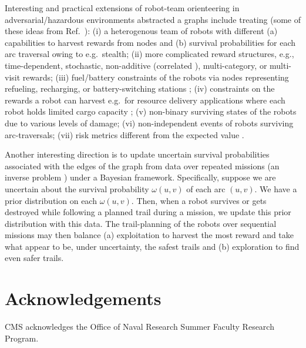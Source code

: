 \documentclass[fleqn,10pt,lineno]{wlpeerj}
\begin{document}
Interesting and practical extensions of robot-team orienteering in adversarial/hazardous environments abstracted a graphs include treating (some of these ideas from Ref.~\cite{jorgensen2018team}): 
(i) a heterogenous team of robots with different (a) capabilities to harvest rewards from nodes and (b) survival probabilities for each arc traversal owing to e.g.\ stealth;
(ii) more complicated reward structures, e.g., time-dependent, stochastic, non-additive (correlated \cite{yu2014correlated}), multi-category, or multi-visit rewards;
(iii) fuel/battery constraints of the robots via nodes representing refueling, recharging, or battery-switching stations \cite{asghar2023risk,khuller2011fill,liao2016electric,yu2019coverage}; 
(iv) constraints on the rewards a robot can harvest e.g.\ for resource delivery applications where each robot holds limited cargo capacity \cite{coelho2014thirty};
(v) non-binary surviving states of the robots due to various levels of damage;
(vi) non-independent events of robots surviving arc-traversals;
(vii) risk metrics different from the expected value \cite{majumdar2020should}.

Another interesting direction is to update uncertain survival probabilities associated with the edges of the graph from data over repeated missions (an inverse problem \cite{burton1992instance}) under a Bayesian framework. 
Specifically, suppose we are uncertain about the survival probability $\omega(u, v)$ of each arc $(u,v)$. We have a prior distribution on each $\omega(u,v)$. Then, when a robot survives or gets destroyed while following a planned trail during a mission, we update this prior distribution with this data. 
The trail-planning of the robots over sequential missions may then balance (a) exploitation to harvest the most reward and take what appear to be, under uncertainty, the safest trails and (b) exploration to find even safer trails.

\section*{Acknowledgements} CMS acknowledges the Office of Naval Research Summer Faculty Research Program.



\end{document}
